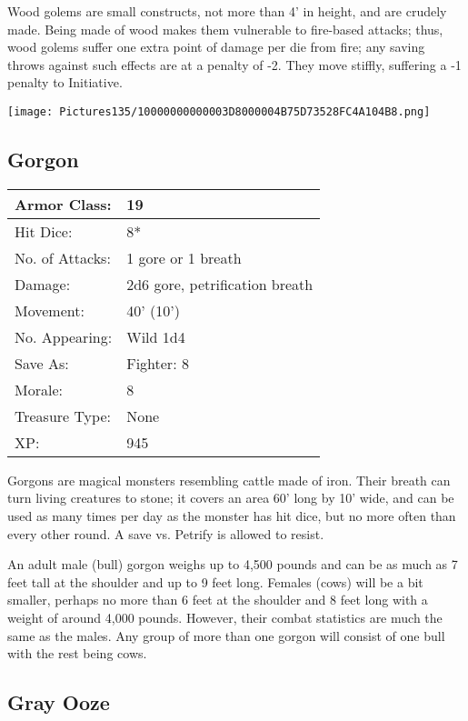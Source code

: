 \documentclass[a4paper,twoside,openany,10pt]{book}
\begin{document}
\begin{multicols}{2}
Wood golems are small constructs, not more than 4' in height, and are crudely made. Being made of wood makes them vulnerable to fire-based attacks; thus, wood golems suffer one extra point of damage per die from fire; any saving throws against such effects are at a penalty of -2. They move stiffly, suffering a -1 penalty to Initiative.

\begin{center}
	\texttt{[image: Pictures135/10000000000003D8000004B75D73528FC4A104B8.png]}
\end{center}

\subsection*{Gorgon}\label{gorgon}

\begin{tabularx}{0.48\textwidth}{@{}lX@{}}
Armor Class: & 19 \\\hline
Hit Dice: & 8* \\\hline
No. of Attacks: & 1 gore or 1 breath \\\hline
Damage: & 2d6 gore, petrification breath \\\hline
Movement: & 40' (10') \\\hline
No. Appearing: & Wild 1d4 \\\hline
Save As: & Fighter: 8 \\\hline
Morale: & 8 \\\hline
Treasure Type: & None \\\hline
XP: & 945 \\\hline
\end{tabularx}\medskip

Gorgons are magical monsters resembling cattle made of iron. Their breath can turn living creatures to stone; it covers an area 60' long by 10' wide, and can be used as many times per day as the monster has hit dice, but no more often than every other round. A save vs. Petrify is allowed to resist. 

An adult male (bull) gorgon weighs up to 4,500 pounds and can be as much as 7 feet tall at the shoulder and up to 9 feet long. Females (cows) will be a bit smaller, perhaps no more than 6 feet at the shoulder and 8 feet long with a weight of around 4,000 pounds. However, their combat statistics are much the same as the males. Any group of more than one gorgon will consist of one bull with the rest being cows.

\subsection*{Gray Ooze}\label{gray-ooze}


\end{multicols}
\end{document}
